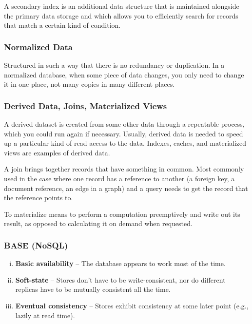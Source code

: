 \documentclass{article}
\begin{document}
    A secondary index is an additional data structure that is maintained alongside the primary data storage and which allows you to efficiently search for records that match a certain kind of condition.
    
    \subsubsection{Normalized Data}
    Structured in such a way that there is no redundancy or duplication. In a normalized database, when some piece of data changes, you only need to change it in one place, not many copies in many different places.
    
    \subsubsection{Derived Data, Joins, Materialized Views}
    A derived dataset is created from some other data through a repeatable process, which you could run again if necessary. Usually, derived data is needed to speed up a particular kind of read access to the data.  Indexes, caches, and materialized views are examples of derived data.
    
    A join brings together records that have something in common. Most commonly used in the case where one record has a reference to another (a foreign key, a document reference, an edge in a graph) and a query needs to get the record that the reference points to.
    
    To materialize means to perform a computation preemptively and write out its result, as opposed to calculating it on demand when requested.
    
    \subsubsection{BASE (NoSQL)}
    \begin{enumerate}[i.]
        \item \textbf{Basic availability} -- The database appears to work most of the time.
        \item \textbf{Soft-state} -- Stores don’t have to be write-consistent, nor do different replicas have to be mutually consistent all the time.
        \item \textbf{Eventual consistency} -- Stores exhibit consistency at some later point (e.g., lazily at read time).
    \end{enumerate}
    
\end{document}
